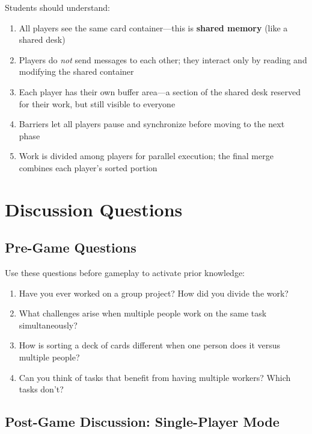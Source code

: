 Students should understand:

\begin{enumerate}
    \item All players see the same card container---this is \textbf{shared memory} (like a shared desk)
    \item Players do \emph{not} send messages to each other; they interact only by reading and modifying the shared container
    \item Each player has their own buffer area---a section of the shared desk reserved for their work, but still visible to everyone
    \item Barriers let all players pause and synchronize before moving to the next phase
    \item Work is divided among players for parallel execution; the final merge combines each player's sorted portion
\end{enumerate}

\section{Discussion Questions}
\label{app:d:discussion-questions}

\subsection{Pre-Game Questions}

Use these questions before gameplay to activate prior knowledge:

\begin{enumerate}
    \item Have you ever worked on a group project? How did you divide the work?
    \item What challenges arise when multiple people work on the same task simultaneously?
    \item How is sorting a deck of cards different when one person does it versus multiple people?
    \item Can you think of tasks that benefit from having multiple workers? Which tasks don't?
\end{enumerate}

\subsection{Post-Game Discussion: Single-Player Mode}

